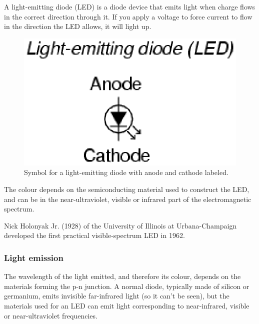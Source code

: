 A light-emitting diode (LED) is a diode device that emits light when charge flows in the correct direction through it. If you apply a voltage to force current to flow in the direction the LED allows, it will light up.

\begin{figure}[H]
\begin{center}
\includegraphics[scale=0.5]{../../epsimages/ledsym.eps}
\caption{Symbol for a light-emitting diode with anode and cathode labeled.}
\end{center}
\end{figure}


The colour depends on the semiconducting material used to construct the LED, and can be in the near-ultraviolet, visible or infrared part of the electromagnetic spectrum.
 
\begin{IFact}{Nick Holonyak Jr. (1928) of the University of Illinois at Urbana-Champaign developed the first practical visible-spectrum LED in 1962.}
\end{IFact}

\subsubsection{Light emission}
The wavelength of the light emitted, and therefore its colour, depends on the materials forming the p-n junction. A normal diode, typically made of silicon or germanium, emits invisible far-infrared light (so it can't be seen), but the materials used for an LED can emit light corresponding to near-infrared, visible or near-ultraviolet frequencies.

